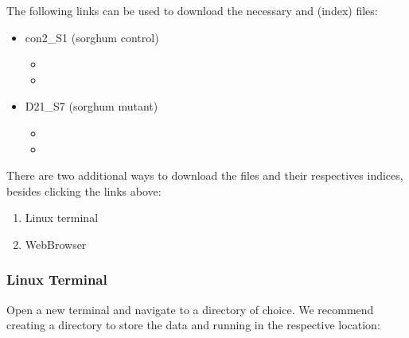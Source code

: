 \documentclass[letterpaper,10pt,english]{sphinxhowto}
\begin{document}
\sphinxAtStartPar
The following links can be used to download the necessary  and  (index) files:
\begin{itemize}
\item {} 
\sphinxAtStartPar
con\sphinxhyphen{}2\_S1 (sorghum control)
\begin{itemize}
\item {} 
\sphinxAtStartPar
{}

\item {} 
\sphinxAtStartPar
{}

\end{itemize}

\item {} 
\sphinxAtStartPar
D2\sphinxhyphen{}1\_S7 (sorghum mutant)
\begin{itemize}
\item {} 
\sphinxAtStartPar
{}

\item {} 
\sphinxAtStartPar
{}

\end{itemize}

\end{itemize}

\sphinxAtStartPar
There are two additional ways to download the  files and their respectives indices, besides clicking the links above:
\begin{enumerate}
%
\item {} 
\sphinxAtStartPar
Linux terminal

\item {} 
\sphinxAtStartPar
Web\sphinxhyphen{}Browser

\end{enumerate}


\subsubsection{Linux Terminal}
\label{\detokenize{index:linux-terminal}}
\sphinxAtStartPar
Open a new terminal and navigate to a directory of choice. We recommend creating a directory to store the data and running  in the respective location:
\end{document}
